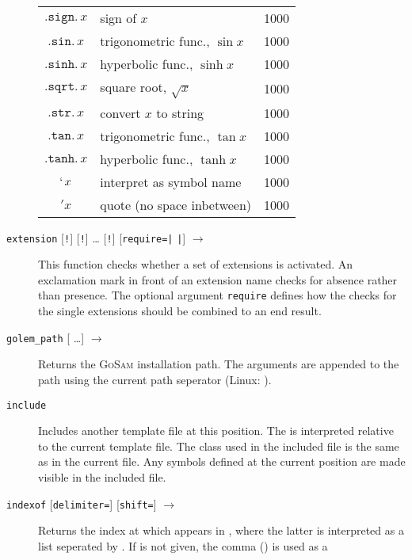 \documentclass[11pt,a4paper]{refrep}
\newcommand{\golem}{\textsc{GoSam}\xspace}
\begin{document}
\begin{description}
\begin{center}
\begin{longtable}{|c|p{12em}|r|}
   $\mathtt{.sign.}\,x$ & sign of $x$ & 1000\\
   $\mathtt{.sin.}\,x$ & trigonometric func., $\sin x$ & 1000\\
   $\mathtt{.sinh.}\,x$ & hyperbolic func., $\sinh x$ & 1000\\
   $\mathtt{.sqrt.}\,x$ & square root, $\sqrt{x}$ & 1000\\
   $\mathtt{.str.}\,x$ & convert $x$ to string & 1000\\
   $\mathtt{.tan.}\,x$ & trigonometric func., $\tan x$ & 1000\\
   $\mathtt{.tanh.}\,x$ & hyperbolic func., $\tanh x$ & 1000\\
   $\mathtt{`}\,x$ & interpret as symbol name & 1000\\
   $\mathtt{'}x$ & quote (no space inbetween) & 1000\\
   \end{longtable}
   \end{center}
\item[\texttt{extension} {[\texttt{!}]}\synt{name$_1$} 
   {[\texttt{!}]}\synt{name$_2$} \dots
   {[\texttt{!}]}\synt{name$_n$} {[\texttt{require=}\lit{all}\texttt{|}%
\lit{any}\texttt{|}\lit{no}]} $\to$ \synt{logical}]
   This function checks whether a set of extensions is activated.
   An exclamation mark in front of an extension name checks for absence
   rather than presence. The optional argument \texttt{require}
   defines how the checks for the single extensions should be combined
   to an end result.
\item[\texttt{golem\_path} {[\synt{arg$_1$} \ldots \synt{arg$_n$}]} $\to$
   \synt{string}]
   Returns the \golem{} installation path. The arguments are appended to
   the path using the current path seperator (Linux: \lit{/}).
\item[\texttt{include} \synt{file-name}] Includes another template file
   at this position. The  is interpreted relative to the
   current template file. The class used in the included file is the same
   as in the current file. Any symbols defined at the current position
   are made visible in the included file.
\item[\texttt{indexof} \synt{needle} \synt{haystack}
   {[\texttt{delimiter=}\synt{delimiter}]}
   {[\texttt{shift=}\synt{shift}]} $\to$ \synt{integer}]
   Returns the index at which  appears in ,
   where the latter is interpreted as a list seperated by .
   If  is not given, the comma (\lit{,}) is used as a

\end{description}
\end{document}
